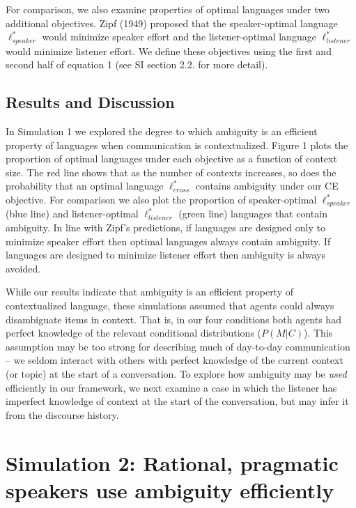 \documentclass[10pt, letterpaper]{article}
\begin{document}
For comparison, we also examine properties of optimal languages under
two additional objectives. Zipf (1949) proposed that the speaker-optimal
language \(\ell_{speaker}^*\) would minimize speaker effort and the
listener-optimal language \(\ell_{listener}^*\) would minimize listener
effort. We define these objectives using the first and second half of
equation 1 (see SI section 2.2. for more detail).\par

\subsection{Results and Discussion}\label{results-and-discussion}

In Simulation 1 we explored the degree to which ambiguity is an
efficient property of languages when communication is contextualized.
Figure 1 plots the proportion of optimal languages under each objective
as a function of context size. The red line shows that as the number of
contexts increases, so does the probability that an optimal language
\(\ell^*_{cross}\) contains ambiguity under our CE objective. For
comparison we also plot the proportion of speaker-optimal
\(\ell^*_{speaker}\) (blue line) and listener-optimal
\(\ell^*_{listener}\) (green line) languages that contain ambiguity. In
line with Zipf's predictions, if languages are designed only to minimize
speaker effort then optimal languages always contain ambiguity. If
languages are designed to minimize listener effort then ambiguity is
always avoided.\par

While our results indicate that ambiguity is an efficient property of
contextualized language, these simulations assumed that agents could
always disambiguate items in context. That is, in our four conditions
both agents had perfect knowledge of the relevant conditional
distributions (\(P(M|C)\)). This assumption may be too strong for
describing much of day-to-day communication -- we seldom interact with
others with perfect knowledge of the current context (or topic) at the
start of a conversation. To explore how ambiguity may be \textit{used}
efficiently in our framework, we next examine a case in which the
listener has imperfect knowledge of context at the start of the
conversation, but may infer it from the discourse history.\par

\section{Simulation 2: Rational, pragmatic speakers use ambiguity
efficiently}\label{simulation-2-rational-pragmatic-speakers-use-ambiguity-efficiently}
\end{document}

